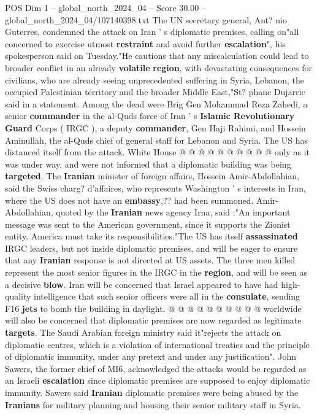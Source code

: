 \begin{textsample}{POS Dim 1 – global\_north\_2024\_04 – Score 30.00 – global\_north\_2024\_04/107140398.txt}
The UN secretary general, Ant? nio Guterres, condemned the attack on Iran ' s diplomatic premises, calling on"all concerned to exercise utmost \textbf{restraint} and avoid further \textbf{escalation}", his spokesperson said on Tuesday."He cautions that any miscalculation could lead to broader conflict in an already \textbf{volatile} \textbf{region}, with devastating consequences for civilians, who are already seeing unprecedented suffering in Syria, Lebanon, the occupied Palestinian territory and the broader Middle East,"St? phane Dujarric said in a statement.
Among the dead were Brig Gen Mohammad Reza Zahedi, a senior \textbf{commander} in the al-Quds force of Iran ' s \textbf{Islamic} \textbf{Revolutionary} \textbf{Guard} Corps ( IRGC ), a deputy \textbf{commander}, Gen Haji Rahimi, and Hossein Aminullah, the al-Quds chief of general staff for Lebanon and Syria.
The US has distanced itself from the attack.
White House @ @ @ @ @ @ @ @ @ @ only as it was under way, and were not informed that a diplomatic building was being \textbf{targeted}.
The \textbf{Iranian} minister of foreign affairs, Hossein Amir-Abdollahian, said the Swiss charg? d'affaires, who represents Washington ' s interests in Iran, where the US does not have an \textbf{embassy},?? had been summoned.
Amir-Abdollahian, quoted by the \textbf{Iranian} news agency Irna, said :"An important message was sent to the American government, since it supports the Zionist entity.
America must take its responsibilities."The US has itself \textbf{assassinated} IRGC leaders, but not inside diplomatic premises, and will be eager to ensure that any \textbf{Iranian} response is not directed at US assets.
The three men killed represent the most senior figures in the IRGC in the \textbf{region}, and will be seen as a decisive \textbf{blow}.
Iran will be concerned that Israel appeared to have had high-quality intelligence that such senior officers were all in the \textbf{consulate}, sending F16 \textbf{jets} to bomb the building in daylight. @ @ @ @ @ @ @ @ @ @ worldwide will also be concerned that diplomatic premises are now regarded as legitimate \textbf{targets}.
The Saudi Arabian foreign ministry said it"rejects the attack on diplomatic centres, which is a violation of international treaties and the principle of diplomatic immunity, under any pretext and under any justification".
John Sawers, the former chief of MI6, acknowledged the attacks would be regarded as an Israeli \textbf{escalation} since diplomatic premises are supposed to enjoy diplomatic immunity.
Sawers said \textbf{Iranian} diplomatic premises were being abused by the \textbf{Iranians} for military planning and housing their senior military staff in Syria.

\end{textsample}
